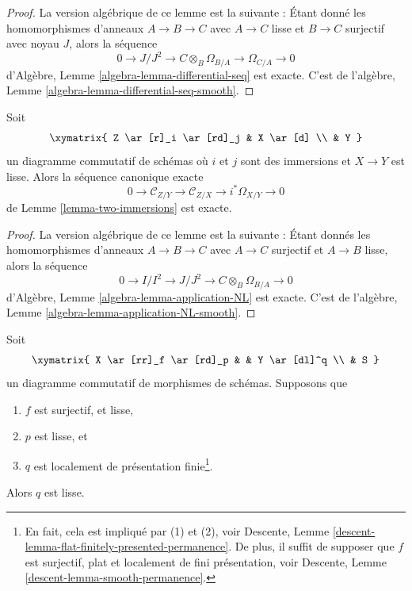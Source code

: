 \begin{proof}
La version algébrique de ce lemme est la suivante : Étant donné
les homomorphismes d'anneaux $A \to B \to C$ avec $A \to C$ lisse et $B \to C$
surjectif avec noyau $J$, alors la séquence
$$
0 \to J/J^2 \to C \otimes_B \Omega_{B/A} \to \Omega_{C/A} \to 0
$$
d'Algèbre,
Lemme \ref{algebra-lemma-differential-seq} est exacte.
C'est
de l'algèbre, Lemme \ref{algebra-lemma-differential-seq-smooth}.
\end{proof}

\begin{lemma}
\label{lemma-two-immersions-smooth}
Soit
$$
\xymatrix{
Z \ar[r]_i \ar[rd]_j & X \ar[d] \\
& Y
}
$$
un diagramme commutatif de schémas où $i$ et $j$ sont des immersions
et $X \to Y$ est lisse.
Alors la séquence canonique exacte
$$
0 \to  \mathcal{C}_{Z/Y} \to \mathcal{C}_{Z/X} \to i^*\Omega_{X/Y} \to 0
$$
de
Lemme \ref{lemma-two-immersions}
est exacte.
\end{lemma}

\begin{proof}
La version algébrique de ce lemme est la suivante : Étant donnés
les homomorphismes d'anneaux $A \to B \to C$ avec $A \to C$ surjectif et $A \to B$
lisse, alors la séquence
$$
0 \to I/I^2 \to J/J^2 \to C \otimes_B \Omega_{B/A} \to 0
$$
d'Algèbre,
Lemme \ref{algebra-lemma-application-NL} est
exacte. C'est
de l'algèbre, Lemme \ref{algebra-lemma-application-NL-smooth}.
\end{proof}

\begin{lemma}
\label{lemma-smooth-permanence}
Soit
$$
\xymatrix{
X \ar[rr]_f \ar[rd]_p & &
Y \ar[dl]^q \\
& S
}
$$
un diagramme commutatif de morphismes de schémas. Supposons que
\begin{enumerate}
\item $f$ est surjectif, et lisse,
\item $p$ est lisse, et
\item $q$ est localement de présentation finie\footnote{En
fait, cela est
impliqué par (1) et (2), voir Descente, Lemme \ref{descent-lemma-flat-finitely-presented-permanence}. De plus,
il suffit de supposer que $f$ est surjectif, plat et
localement de fini présentation,
voir Descente, Lemme \ref{descent-lemma-smooth-permanence}.}.
\end{enumerate}
Alors $q$ est lisse.
\end{lemma}

